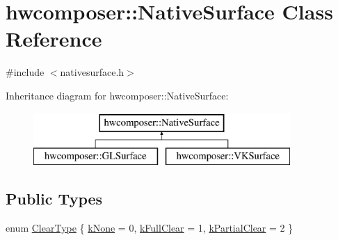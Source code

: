 \hypertarget{classhwcomposer_1_1NativeSurface}{}\section{hwcomposer\+:\+:Native\+Surface Class Reference}
\label{classhwcomposer_1_1NativeSurface}


{\ttfamily \#include $<$nativesurface.\+h$>$}

Inheritance diagram for hwcomposer\+:\+:Native\+Surface\+:\begin{figure}[H]
\begin{center}
\leavevmode
\includegraphics[height=2.000000cm]{classhwcomposer_1_1NativeSurface}
\end{center}
\end{figure}
\subsection*{Public Types}
\begin{DoxyCompactItemize}
\item 
enum \mbox{\hyperlink{classhwcomposer_1_1NativeSurface_a0d0f955fc1e9f95c9684e9524f4217d6}{Clear\+Type}} \{ \mbox{\hyperlink{classhwcomposer_1_1NativeSurface_a0d0f955fc1e9f95c9684e9524f4217d6a61ab9864bcc7860917f12c33382befbc}{k\+None}} = 0, 
\mbox{\hyperlink{classhwcomposer_1_1NativeSurface_a0d0f955fc1e9f95c9684e9524f4217d6a28fd0ed803677f131961bf65544b9f83}{k\+Full\+Clear}} = 1, 
\mbox{\hyperlink{classhwcomposer_1_1NativeSurface_a0d0f955fc1e9f95c9684e9524f4217d6a9013ff88c3057374f48271defba26707}{k\+Partial\+Clear}} = 2
 \}
\end{DoxyCompactItemize}

